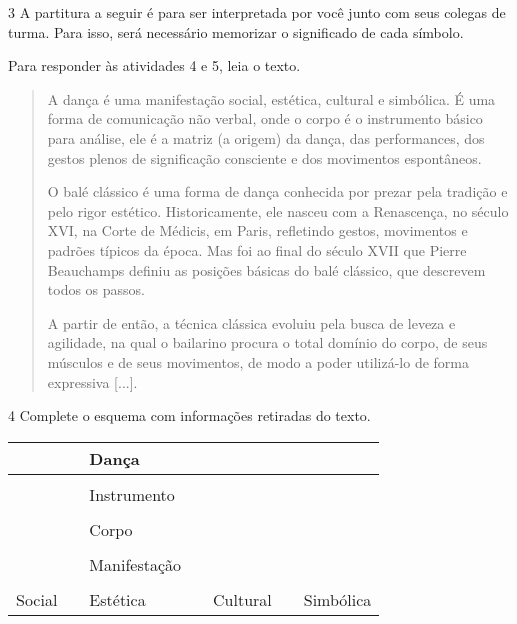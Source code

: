 \num{3}  A partitura a seguir é para ser interpretada por você junto com seus
  colegas de turma. Para isso, será necessário memorizar o significado
  de cada símbolo.


Para responder às atividades 4 e 5, leia o texto.

\begin{quote}
A dança é uma manifestação social, estética, cultural e simbólica. É uma
forma de comunicação não verbal, onde o corpo é o instrumento básico
para análise, ele é a matriz (a origem) da dança, das performances, dos
gestos plenos de significação consciente e dos movimentos espontâneos.

O balé clássico é uma forma de dança conhecida por prezar pela tradição
e pelo rigor estético. Historicamente, ele nasceu com a Renascença, no século XVI, na
Corte de Médicis, em Paris, refletindo gestos, movimentos e padrões
típicos da época. Mas foi ao final do século XVII que Pierre Beauchamps
definiu as posições básicas do balé clássico, que descrevem todos os
passos.

A partir de então, a técnica clássica
evoluiu pela busca de leveza e agilidade, na qual o
bailarino procura o total domínio do corpo, de seus músculos e de seus
movimentos, de modo a poder utilizá-lo de forma expressiva {[}...{]}.

\end{quote}

\num{4}  Complete o esquema com informações retiradas do texto.


\begin{longtable}[]{@{}lllllll@{}}
\toprule
& & \textbf{Dança} & & &\tabularnewline
\midrule
\endhead
& & & & & &\tabularnewline
& & Instrumento & & &\tabularnewline
& & & & & &\tabularnewline
& & Corpo & & &\tabularnewline
& & & & & &\tabularnewline
& & Manifestação & &\tabularnewline
& & & & & &\tabularnewline
Social & & Estética & & Cultural & & Simbólica\tabularnewline
\bottomrule
\end{longtable}

